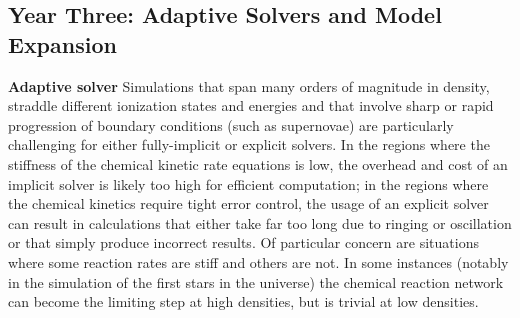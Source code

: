 

\subsection{Year Three: Adaptive Solvers and Model Expansion}

\noindent \textbf{Adaptive solver}
Simulations that span many orders of magnitude in density, straddle different
ionization states and energies and that involve sharp or rapid progression of
boundary conditions (such as supernovae) are particularly challenging for
either fully-implicit or explicit solvers.  In the regions where the stiffness
of the chemical kinetic rate equations is low, the overhead and cost of an
implicit solver is likely too high for efficient computation; in the regions
where the chemical kinetics require tight error control, the usage of an
explicit solver can result in calculations that either take far too long due to
ringing or oscillation or that simply produce incorrect results.  Of particular
concern are situations where some reaction rates are stiff and others are not.
In some instances (notably in the simulation of the first stars in the
universe) the chemical reaction network can become the limiting step at high
densities, but is trivial at low densities.

